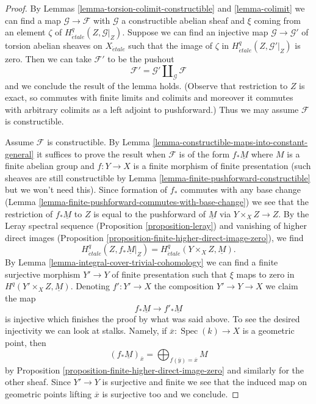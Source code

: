 \documentclass[10pt,a4paper]{amsart}
\theoremstyle{plain}
\theoremstyle{definition}
\theoremstyle{remark}
\numberwithin{equation}{subsection}
\def\Spec{\mathop{\mathrm{Spec}}}
\def\etale{{\acute{e}tale}}
\begin{document}
\begin{proof}
By Lemmas \ref{lemma-torsion-colimit-constructible} and \ref{lemma-colimit}
we can find a map $\mathcal{G} \to \mathcal{F}$ with $\mathcal{G}$
a constructible abelian sheaf and $\xi$ coming from an element $\zeta$ of
$H^q_\etale(Z, \mathcal{G}|_Z)$. Suppose we can find an injective map
$\mathcal{G} \to \mathcal{G}'$ of torsion abelian sheaves on $X_\etale$
such that the image of $\zeta$ in $H^q_\etale(Z, \mathcal{G}'|_Z)$ is zero.
Then we can take $\mathcal{F}'$ to be the pushout
$$
\mathcal{F}' = \mathcal{G}' \amalg_{\mathcal{G}} \mathcal{F}
$$
and we conclude the result of the lemma holds. (Observe that restriction
to $Z$ is exact, so commutes with finite limits and colimits and moreover
it commutes with arbitrary colimits as a left adjoint to pushforward.)
Thus we may assume $\mathcal{F}$ is constructible.

\medskip\noindent
Assume $\mathcal{F}$ is constructible. By
Lemma \ref{lemma-constructible-maps-into-constant-general}
it suffices to prove the result when $\mathcal{F}$
is of the form $f_*\underline{M}$ where $M$ is a finite abelian group
and $f : Y \to X$ is a finite morphism of finite presentation
(such sheaves are still constructible by
Lemma \ref{lemma-finite-pushforward-constructible}
but we won't need this).
Since formation of $f_*$ commutes with any base change
(Lemma \ref{lemma-finite-pushforward-commutes-with-base-change})
we see that the restriction of $f_*\underline{M}$ to $Z$ is
equal to the pushforward of $\underline{M}$ via
$Y \times_X Z \to Z$. By the Leray spectral sequence
(Proposition \ref{proposition-leray})
and vanishing of higher direct images
(Proposition \ref{proposition-finite-higher-direct-image-zero}),
we find
$$
H^q_\etale(Z, f_*\underline{M}|_Z) = H^q_\etale(Y \times_X Z, \underline{M}).
$$
By Lemma \ref{lemma-integral-cover-trivial-cohomology}
we can find a finite surjective morphism $Y' \to Y$ of finite presentation
such that $\xi$ maps to zero in $H^q(Y' \times_X Z, \underline{M})$.
Denoting $f' : Y' \to X$ the composition $Y' \to Y \to X$ we claim
the map
$$
f_*\underline{M} \longrightarrow f'_*\underline{M}
$$
is injective which finishes the proof by what was said above.
To see the desired injectivity we can look at stalks. Namely,
if $\overline{x} : \Spec(k) \to X$ is a geometric point, then
$$
(f_*\underline{M})_{\overline{x}} =
\bigoplus\nolimits_{f(\overline{y}) = \overline{x}} M
$$
by Proposition \ref{proposition-finite-higher-direct-image-zero}
and similarly for the other sheaf.
Since $Y' \to Y$ is surjective and finite we see that
the induced map on geometric points lifting $\overline{x}$ is
surjective too and we conclude.
\end{proof}
\end{document}
